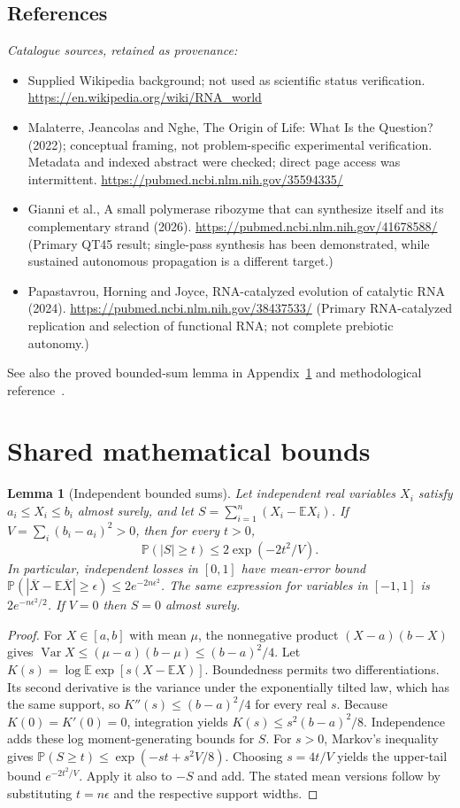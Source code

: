 \documentclass[11pt]{article}
\newcommand{\E}{\mathbb E}
\newcommand{\Prob}{\mathbb P}
\DeclareMathOperator{\Var}{Var}
\providecommand{\E}{\mathbb E}
\providecommand{\Prob}{\mathbb P}
\providecommand{\Var}{\operatorname{Var}}
\newtheorem{sharedlemma}{Lemma}[section]
\begin{document}
\subsection{References}
\noindent\emph{Catalogue sources, retained as provenance:}
\begin{itemize}
\item Supplied Wikipedia background; not used as scientific status verification. \url{https://en.wikipedia.org/wiki/RNA_world}
\item Malaterre, Jeancolas and Nghe, The Origin of Life: What Is the Question? (2022); conceptual framing, not problem-specific experimental verification. Metadata and indexed abstract were checked; direct page access was intermittent. \url{https://pubmed.ncbi.nlm.nih.gov/35594335/}
\item Gianni et al., A small polymerase ribozyme that can synthesize itself and its complementary strand (2026). \url{https://pubmed.ncbi.nlm.nih.gov/41678588/} (Primary QT45 result; single-pass synthesis has been demonstrated, while sustained autonomous propagation is a different target.)
\item Papastavrou, Horning and Joyce, RNA-catalyzed evolution of catalytic RNA (2024). \url{https://pubmed.ncbi.nlm.nih.gov/38437533/} (Primary RNA-catalyzed replication and selection of functional RNA; not complete prebiotic autonomy.)
\end{itemize}
\noindent See also the proved bounded-sum lemma in Appendix~\ref{app:bounds} and methodological reference~\cite{hoeffding}.
\clearpage


\appendix
\section{Shared mathematical bounds}\label{app:bounds}
\begin{sharedlemma}[Independent bounded sums]\label{lem:bounded}
Let independent real variables $X_i$ satisfy $a_i\leq X_i\leq b_i$ almost surely,
and let $S=\sum_{i=1}^n(X_i-\E X_i)$. If
$V=\sum_i(b_i-a_i)^2>0$, then for every $t>0$,
\[
 \Prob(|S|\geq t)\leq 2\exp(-2t^2/V).
\]
In particular, independent losses in $[0,1]$ have mean-error bound
$\Prob(|\overline X-\E\overline X|\geq\epsilon)
\leq2e^{-2n\epsilon^2}$. The same expression for variables in $[-1,1]$
is $2e^{-n\epsilon^2/2}$. If $V=0$ then $S=0$ almost surely.
\end{sharedlemma}
\begin{proof}
For $X\in[a,b]$ with mean $\mu$, the nonnegative product
$(X-a)(b-X)$ gives
$\Var X\leq(\mu-a)(b-\mu)\leq(b-a)^2/4$.
Let $K(s)=\log\E\exp[s(X-\E X)]$.
Boundedness permits two differentiations. Its second derivative is the variance
under the exponentially tilted law, which has the same support, so
$K''(s)\leq(b-a)^2/4$ for every real $s$.
Because $K(0)=K'(0)=0$, integration yields
$K(s)\leq s^2(b-a)^2/8$.
Independence adds these log moment-generating bounds for $S$.
For $s>0$, Markov's inequality gives
$\Prob(S\geq t)\leq\exp(-st+s^2V/8)$.
Choosing $s=4t/V$ yields the upper-tail bound $e^{-2t^2/V}$.
Apply it also to $-S$ and add. The stated mean versions follow by substituting
$t=n\epsilon$ and the respective support widths.
\end{proof}
\end{document}

